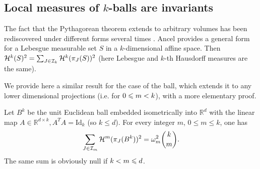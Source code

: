 \subsection{Local measures of $k$-balls are invariants}

The fact that the Pythagorean theorem extends to arbitrary volumes has
been rediscovered under different forms several times \cite{Conant01031974,Czyzewska:1991}. Ancel \cite{ancel2023pythagorean} provides a general form
for a Lebesgue measurable set $S$ in a $k$-dimensional affine
space. Then $\mathcal{H}^k(S)^2=\sum_{J \in \mathcal{I}_k} \mathcal{H}^k(\pi_J(S))^2$ (here
Lebesgue and $k$-th Hausdorff measures are the same).

We provide here a similar result for the case of the ball, which extends it to any  lower dimensional projections (i.e. for $0 \leqslant m < k$), with a more elementary proof. 
\begin{theorem}\label{thm:ball-invariants}
Let $B^k$ be the unit Euclidean ball embedded isometrically into
$\mathbb{R}^d$ with the linear map $A\in\mathbb{R}^{d\times k}, A^T
A=\mathrm{Id}_k$ (so $k \le d$).  For every integer $m$, $0\le m\le k$, one has
\begin{equation}
  \label{eq:ball-invariants}
  \sum_{J \in \mathcal{I}_m} \mathcal{H}^m(\pi_J(B^k))^2 = \omega_m^2 \binom{k}{m}.
\end{equation}
The same sum is obviously null if $k < m \leqslant d$.
\end{theorem}

